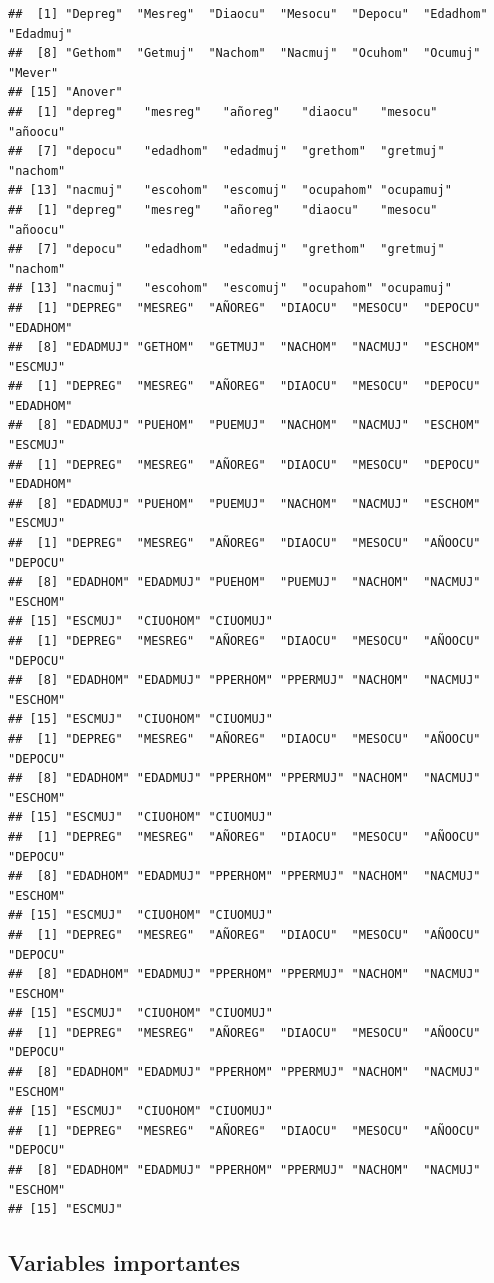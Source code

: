 \documentclass[
]{article}
\begin{document}
\begin{verbatim}
##  [1] "Depreg"  "Mesreg"  "Diaocu"  "Mesocu"  "Depocu"  "Edadhom" "Edadmuj"
##  [8] "Gethom"  "Getmuj"  "Nachom"  "Nacmuj"  "Ocuhom"  "Ocumuj"  "Mever"  
## [15] "Anover" 
##  [1] "depreg"   "mesreg"   "añoreg"   "diaocu"   "mesocu"   "añoocu"  
##  [7] "depocu"   "edadhom"  "edadmuj"  "grethom"  "gretmuj"  "nachom"  
## [13] "nacmuj"   "escohom"  "escomuj"  "ocupahom" "ocupamuj"
##  [1] "depreg"   "mesreg"   "añoreg"   "diaocu"   "mesocu"   "añoocu"  
##  [7] "depocu"   "edadhom"  "edadmuj"  "grethom"  "gretmuj"  "nachom"  
## [13] "nacmuj"   "escohom"  "escomuj"  "ocupahom" "ocupamuj"
##  [1] "DEPREG"  "MESREG"  "AÑOREG"  "DIAOCU"  "MESOCU"  "DEPOCU"  "EDADHOM"
##  [8] "EDADMUJ" "GETHOM"  "GETMUJ"  "NACHOM"  "NACMUJ"  "ESCHOM"  "ESCMUJ" 
##  [1] "DEPREG"  "MESREG"  "AÑOREG"  "DIAOCU"  "MESOCU"  "DEPOCU"  "EDADHOM"
##  [8] "EDADMUJ" "PUEHOM"  "PUEMUJ"  "NACHOM"  "NACMUJ"  "ESCHOM"  "ESCMUJ" 
##  [1] "DEPREG"  "MESREG"  "AÑOREG"  "DIAOCU"  "MESOCU"  "DEPOCU"  "EDADHOM"
##  [8] "EDADMUJ" "PUEHOM"  "PUEMUJ"  "NACHOM"  "NACMUJ"  "ESCHOM"  "ESCMUJ" 
##  [1] "DEPREG"  "MESREG"  "AÑOREG"  "DIAOCU"  "MESOCU"  "AÑOOCU"  "DEPOCU" 
##  [8] "EDADHOM" "EDADMUJ" "PUEHOM"  "PUEMUJ"  "NACHOM"  "NACMUJ"  "ESCHOM" 
## [15] "ESCMUJ"  "CIUOHOM" "CIUOMUJ"
##  [1] "DEPREG"  "MESREG"  "AÑOREG"  "DIAOCU"  "MESOCU"  "AÑOOCU"  "DEPOCU" 
##  [8] "EDADHOM" "EDADMUJ" "PPERHOM" "PPERMUJ" "NACHOM"  "NACMUJ"  "ESCHOM" 
## [15] "ESCMUJ"  "CIUOHOM" "CIUOMUJ"
##  [1] "DEPREG"  "MESREG"  "AÑOREG"  "DIAOCU"  "MESOCU"  "AÑOOCU"  "DEPOCU" 
##  [8] "EDADHOM" "EDADMUJ" "PPERHOM" "PPERMUJ" "NACHOM"  "NACMUJ"  "ESCHOM" 
## [15] "ESCMUJ"  "CIUOHOM" "CIUOMUJ"
##  [1] "DEPREG"  "MESREG"  "AÑOREG"  "DIAOCU"  "MESOCU"  "AÑOOCU"  "DEPOCU" 
##  [8] "EDADHOM" "EDADMUJ" "PPERHOM" "PPERMUJ" "NACHOM"  "NACMUJ"  "ESCHOM" 
## [15] "ESCMUJ"  "CIUOHOM" "CIUOMUJ"
##  [1] "DEPREG"  "MESREG"  "AÑOREG"  "DIAOCU"  "MESOCU"  "AÑOOCU"  "DEPOCU" 
##  [8] "EDADHOM" "EDADMUJ" "PPERHOM" "PPERMUJ" "NACHOM"  "NACMUJ"  "ESCHOM" 
## [15] "ESCMUJ"  "CIUOHOM" "CIUOMUJ"
##  [1] "DEPREG"  "MESREG"  "AÑOREG"  "DIAOCU"  "MESOCU"  "AÑOOCU"  "DEPOCU" 
##  [8] "EDADHOM" "EDADMUJ" "PPERHOM" "PPERMUJ" "NACHOM"  "NACMUJ"  "ESCHOM" 
## [15] "ESCMUJ"  "CIUOHOM" "CIUOMUJ"
##  [1] "DEPREG"  "MESREG"  "AÑOREG"  "DIAOCU"  "MESOCU"  "AÑOOCU"  "DEPOCU" 
##  [8] "EDADHOM" "EDADMUJ" "PPERHOM" "PPERMUJ" "NACHOM"  "NACMUJ"  "ESCHOM" 
## [15] "ESCMUJ"
\end{verbatim}

\hypertarget{variables-importantes}{%
\subsection{Variables importantes}\label{variables-importantes}}
\end{document}
